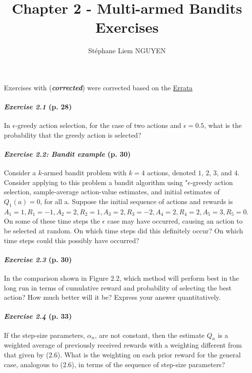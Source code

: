 \documentclass[10pt,a4paper]{article}
\title{Chapter 2 - Multi-armed Bandits Exercises}
\author{Stéphane Liem NGUYEN}
\begin{document}
\maketitle

Exercises with (\textbf{\textit{corrected}}) were corrected based on the \href{http://incompleteideas.net/book/errata.html}{Errata}

\paragraph{\textit{Exercise 2.1} (p. 28)} In $\epsilon$-greedy action selection, for the case of two actions and $\epsilon = 0.5$, what is
the probability that the greedy action is selected?

\paragraph{\textit{Exercise 2.2: Bandit example} (p. 30)} Consider a $k$-armed bandit problem with $k = 4$ actions,
denoted $1$, $2$, $3$, and $4$. Consider applying to this problem a bandit algorithm using
"$\epsilon$-greedy action selection, sample-average action-value estimates, and initial estimates
of $Q_1(a) = 0$, for all a. Suppose the initial sequence of actions and rewards is $A_1 = 1,
R_1 = -1, A_2 = 2, R_2 = 1, A_3 = 2, R_3 = -2, A_4 = 2, R_4 = 2, A_5 = 3, R_5 = 0$. On some of these time steps the $\epsilon$ case may have occurred, causing an action to be selected at
random. On which time steps did this definitely occur? On which time steps could this
possibly have occurred?

\paragraph{\textit{Exercise 2.3} (p. 30)} In the comparison shown in Figure $2.2$, which method will perform best in
the long run in terms of cumulative reward and probability of selecting the best action?
How much better will it be? Express your answer quantitatively.

\paragraph{\textit{Exercise 2.4} (p. 33)} If the step-size parameters, $\alpha_n$, are not constant, then the estimate $Q_n$ is
a weighted average of previously received rewards with a weighting different from that
given by ($2.6$). What is the weighting on each prior reward for the general case, analogous
to ($2.6$), in terms of the sequence of step-size parameters?
\end{document}
